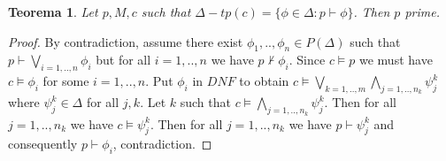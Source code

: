 \documentclass[11pt,a4paper]{article}
\newtheorem{theorem}{Teorema}
\theoremstyle{definition}
\theoremstyle{remark}
\begin{document}
\begin{theorem}

	Let $p,M,c$ such that $\Delta-tp(c) = \{ \phi \in \Delta : p \vdash \phi\}$. Then $p$ prime.
 
\end{theorem}

\begin{proof}

	By contradiction, assume there exist $\phi_1,..,\phi_n \in P(\Delta)$ such that $p \vdash \bigvee_{i=1,..,n} \phi_i$ 
	but for all $i=1,..,n$ we have $p \not \vdash \phi_i$. Since $c \models p$ we must have $c \models \phi_i$ for some $i = 1,..,n$.
	Put $\phi_i$ in $DNF$ to obtain $c \models \bigvee_{k=1,..,m} \bigwedge_{j=1,..,n_k} \psi_j^k$ where $\psi_j^k \in \Delta$ for all $j,k$.
	Let $k$ such that $c \models \bigwedge_{j=1,..,n_k} \psi_j^k$.
	Then for all $j = 1,..,n_k$ we have $c \models \psi_j^k$. 
	Then for all $j=1,..,n_k$ we have $p \vdash \psi_j^k$ and consequently $p \vdash \phi_i$, contradiction.

\end{proof}
\end{document}

